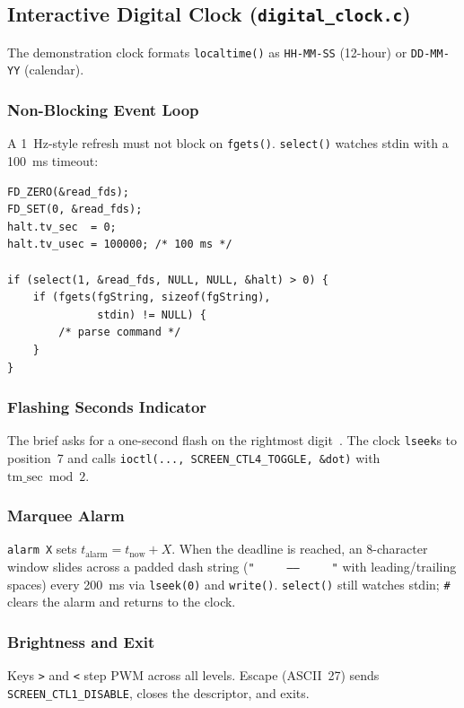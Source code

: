 \documentclass[conference,a4paper]{IEEEtran}
\begin{document}
\subsection{Interactive Digital Clock (\texttt{digital\_clock.c})}

The demonstration clock formats \texttt{localtime()} as \texttt{HH-MM-SS} (12-hour) or \texttt{DD-MM-YY} (calendar).

\subsubsection{Non-Blocking Event Loop}
A 1~Hz-style refresh must not block on \texttt{fgets()}. \texttt{select()} watches stdin with a 100~ms timeout:
\begin{lstlisting}
FD_ZERO(&read_fds);
FD_SET(0, &read_fds);
halt.tv_sec  = 0;
halt.tv_usec = 100000; /* 100 ms */

if (select(1, &read_fds, NULL, NULL, &halt) > 0) {
    if (fgets(fgString, sizeof(fgString),
              stdin) != NULL) {
        /* parse command */
    }
}
\end{lstlisting}

\subsubsection{Flashing Seconds Indicator}
The brief asks for a one-second flash on the rightmost digit~\cite{acs2026}. The clock \texttt{lseek}s to position~7 and calls \texttt{ioctl(..., SCREEN\_CTL4\_TOGGLE, \&dot)} with $\mathrm{tm\_sec} \bmod 2$.

\subsubsection{Marquee Alarm}
\texttt{alarm X} sets $t_{\mathrm{alarm}}=t_{\mathrm{now}}+X$. When the deadline is reached, an 8-character window slides across a padded dash string (\texttt{"~~~~~-----~~~~~"} with leading/trailing spaces) every 200~ms via \texttt{lseek(0)} and \texttt{write()}. \texttt{select()} still watches stdin; \texttt{\#} clears the alarm and returns to the clock.

\subsubsection{Brightness and Exit}
Keys \texttt{>} and \texttt{<} step PWM across all levels. Escape (ASCII~27) sends \texttt{SCREEN\_CTL1\_DISABLE}, closes the descriptor, and exits.
\end{document}
